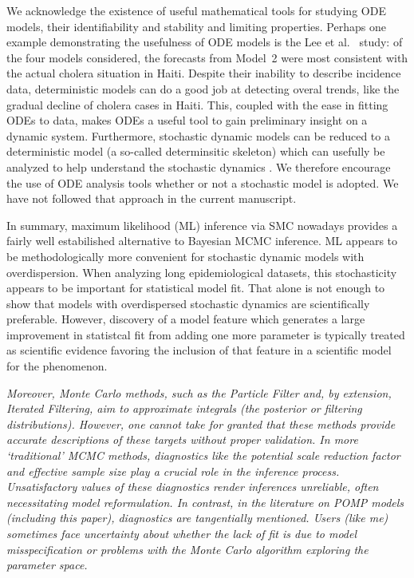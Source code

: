 \documentclass[11pt]{article}
\newcommand\report[1]{{\color{mygreen} \vspace{1mm}\hspace{0.25in}\parbox{6in}{\em #1}}}
\begin{document}

We acknowledge the existence of useful mathematical tools for studying ODE models, their identifiability and stability and limiting properties.
Perhaps one example demonstrating the usefulness of ODE models is the Lee et al.~\cite{lee20} study: of the four models considered, the forecasts from Model~2 were most consistent with the actual cholera situation in Haiti. 
Despite their inability to describe incidence data, deterministic models can do a good job at detecting overal trends, like the gradual decline of cholera cases in Haiti. 
This, coupled with the ease in fitting ODEs to data, makes ODEs a useful tool to gain preliminary insight on a dynamic system. 
Furthermore, stochastic dynamic models can be reduced to a deterministic model (a so-called determinsitic skeleton) which can usefully be analyzed to help understand the stochastic dynamics \cite{coulson04}.
We therefore encourage the use of ODE analysis tools whether or not a stochastic model is adopted.
We have not followed that approach in the current manuscript.

In summary, maximum likelihood (ML) inference via SMC nowadays provides a fairly well estabilished alternative to Bayesian MCMC inference. ML appears to be methodologically more convenient for stochastic dynamic models with overdispersion. When analyzing long epidemiological datasets, this stochasticity appears to be important for statistical model fit. That alone is not enough to show that models with overdispersed stochastic dynamics are scientifically preferable. However, discovery of a  model feature which generates a large improvement in statistcal fit from adding one more parameter is typically treated as scientific evidence favoring the inclusion of that feature in a scientific model for the phenomenon.

\report{
Moreover, Monte Carlo methods, such as the Particle Filter and, by extension, Iterated Filtering, aim to approximate integrals (the posterior or filtering distributions). However, one cannot take for granted that these methods provide accurate descriptions of these targets without proper validation. In more ‘traditional’ MCMC methods, diagnostics like the potential scale reduction factor and effective sample size play a crucial role in the inference process. Unsatisfactory values of these diagnostics render inferences unreliable, often necessitating model reformulation. In contrast, in the literature on POMP models (including this paper), diagnostics are tangentially mentioned. Users (like me) sometimes face uncertainty about whether the lack of fit is due to model misspecification or problems with the Monte Carlo algorithm exploring the parameter space.
}
\end{document}
